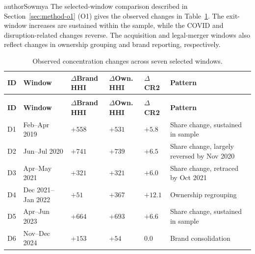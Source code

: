 \begin{mergedcontribution}{authorSowmya}
The selected-window comparison described in Section~\ref{sec:method-o1} (O1) gives the observed changes in Table~\ref{tab:o1-drift}. The exit-window increases are sustained within the sample, while the COVID and disruption-related changes reverse. The acquisition and legal-merger windows also reflect changes in ownership grouping and brand reporting, respectively.
\par
\begingroup
\flowtablestyle
\fontsize{10}{12}\selectfont{}\setlength{\tabcolsep}{3pt}\renewcommand{\arraystretch}{1.15}
\begin{longtable}{|>{\raggedright\arraybackslash}p{}|>{\raggedright\arraybackslash}p{}|>{\raggedright\arraybackslash}p{}|>{\raggedright\arraybackslash}p{}|>{\raggedright\arraybackslash}p{}|>{\raggedright\arraybackslash}p{}|}
\caption{Observed concentration changes across seven selected windows.}\label{tab:o1-drift}\\
\hline
\textbf{ID} & \textbf{Window} & \textbf{$\Delta$Brand HHI} & \textbf{$\Delta$Own. HHI} & \textbf{$\Delta$CR2} & \textbf{Pattern}\\
\hline
\endfirsthead
\multicolumn{6}{c}{\tablename~\thetable\ (continued)}\\
\hline
\textbf{ID} & \textbf{Window} & \textbf{$\Delta$Brand HHI} & \textbf{$\Delta$Own. HHI} & \textbf{$\Delta$CR2} & \textbf{Pattern}\\
\hline
\endhead
\endfoot
\endlastfoot
D1 & Feb--Apr 2019 & $+558$ & $+531$ & $+5.8$ & Share change, sustained in sample\\
\hline
D2 & Jun--Jul 2020 & $+741$ & $+739$ & $+6.5$ & Share change, largely reversed by Nov 2020\\
\hline
D3 & Apr--May 2021 & $+321$ & $+321$ & $+6.0$ & Share change, retraced by Oct 2021\\
\hline
D4 & Dec 2021--Jan 2022 & $+51$ & $+367$ & $+12.1$ & Ownership regrouping\\
\hline
D5 & Apr--Jun 2023 & $+664$ & $+693$ & $+6.6$ & Share change, sustained in sample\\
\hline
D6 & Nov--Dec 2024 & $+153$ & $+54$ & $0.0$ & Brand consolidation\\

\end{longtable}
\end{mergedcontribution}
